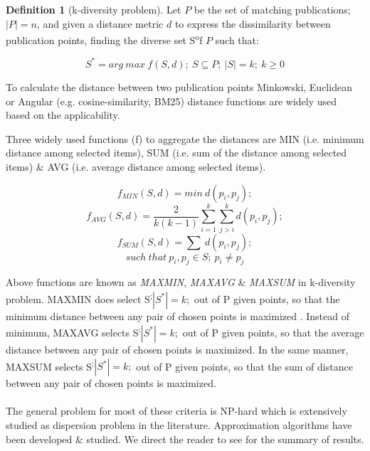 \documentclass[a4paper,12pt,oneside]{book}
\theoremstyle{definition}
\newtheorem{definition}{Definition}[section]
\theoremstyle{remark}
\begin{document}
\begin{definition}[k-diversity problem]
Let $P$ be the set of matching publications; $|P| = n$, and given a distance metric $d$ to express the dissimilarity between publication points, finding the diverse set S\textsuperscript* of $P$ such that:
\begin{center}
\[ S^* = arg\ max\ f(S, d);\ S \subseteq P;\ |S| = k;\ k \geq 0 \]
\end{center}
To calculate the distance between two publication points Minkowski, Euclidean or Angular (e.g. cosine-similarity, BM25) distance functions are widely used based on the applicability.

Three widely used functions (f) to aggregate the distances are MIN (i.e. minimum distance among selected items), SUM (i.e. sum of the distance among selected items) \& AVG (i.e. average distance among selected items). 

\begin{center}
\[ f _{MIN} (S,d) = min\ d(p_{i}, p_{j});\]
\[ f _{AVG} (S,d) = \frac{2}{k(k-1)}\sum_{i=1}^{k}\sum_{j>i}^{k} d(p_{i}, p_{j});\]
\[ f _{SUM} (S,d) = \sum\ d(p_{i}, p_{j});\]
\[such\ that \ p_{i}, p_{j} \in S;\ p_{i} \neq p_{j} \]
\end{center}

Above functions are known as \emph{MAXMIN}, \emph{MAXAVG} \& \emph{MAXSUM} in k-diversity problem. MAXMIN does select S\textsuperscript*;$|S^*|=k;$ out of P given points, so that the minimum distance between any pair of chosen points is maximized \cite{Drosou2010DiversitySurvey}. Instead of minimum, MAXAVG selects S\textsuperscript*;$|S^*|=k;$ out of P given points, so that the average distance between any pair of chosen points is maximized. In the same manner, MAXSUM selects S\textsuperscript*;$|S^*|=k;$ out of P given points, so that the sum of distance between any pair of chosen points is maximized.

\paragraph*{}
The general problem for most of these criteria is NP-hard which is extensively studied as dispersion problem in the literature. Approximation algorithms have been developed \& studied. We direct the reader to see \cite{Chandra2001} for the summary of results.

\end{definition}
\end{document}
